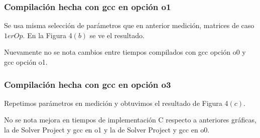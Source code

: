 \subsubsection{Compilación hecha con gcc en opción o1}
Se usa misma selección de parámetros que en anterior medición, matrices de caso $1erOp$. En la Figura 4$(b)$ se ve el resultado.

Nuevamente no se nota cambios entre tiempos compilados con gcc opción o0 y gcc opción o1. 


\subsubsection{Compilación hecha con gcc en opción o3}
Repetimos parámetros en medición y obtuvimos el resultado de Figura 4$(c)$.

No se nota mejora en tiempos de implementación C respecto a anteriores gráficas, la de Solver Project y gcc en o1 y la de Solver Project y gcc en o0.


